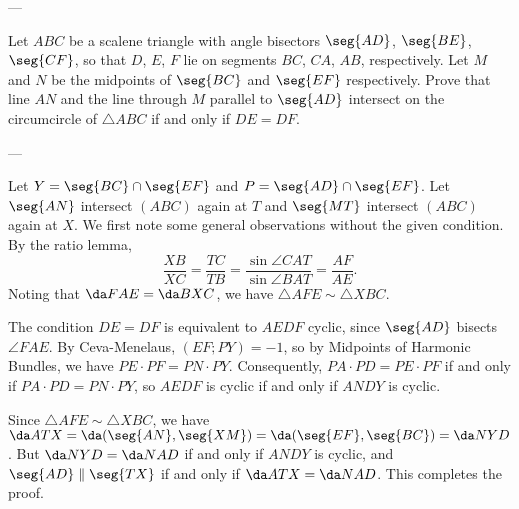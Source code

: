 
---

Let $ABC$ be a scalene triangle with angle bisectors $\seg{AD}$, $\seg{BE}$, $\seg{CF}$, so that $D$, $E$, $F$ lie on segments $BC$, $CA$, $AB$, respectively. Let $M$ and $N$ be the midpoints of $\seg{BC}$ and $\seg{EF}$ respectively. Prove that line $AN$ and the line through $M$ parallel to $\seg{AD}$ intersect on the circumcircle of $\triangle ABC$ if and only if $DE=DF$.

---

Let $Y=\seg{BC}\cap\seg{EF}$ and $P=\seg{AD}\cap\seg{EF}$. Let $\seg{AN}$ intersect $(ABC)$ again at $T$ and $\seg{MT}$ intersect $(ABC)$ again at $X$. We first note some general observations without the given condition. By the ratio lemma, \[\frac{XB}{XC}=\frac{TC}{TB}=\frac{\sin\angle CAT}{\sin\angle BAT}=\frac{AF}{AE}.\]
Noting that $\da FAE=\da BXC$, we have $\triangle AFE\sim\triangle XBC$.

The condition $DE=DF$ is equivalent to $AEDF$ cyclic, since $\seg{AD}$ bisects $\angle FAE$. By Ceva-Menelaus, $(EF;PY)=-1$, so by Midpoints of Harmonic Bundles, we have $PE\cdot PF=PN\cdot PY$. Consequently, $PA\cdot PD=PE\cdot PF$ if and only if $PA\cdot PD=PN\cdot PY$, so $AEDF$ is cyclic if and only if $ANDY$ is cyclic.

Since $\triangle AFE\sim\triangle XBC$, we have $\da ATX=\da(\seg{AN},\seg{XM})=\da(\seg{EF},\seg{BC})=\da NYD$. But $\da NYD=\da NAD$ if and only if $ANDY$ is cyclic, and $\seg{AD}\parallel\seg{TX}$ if and only if $\da ATX=\da NAD$. This completes the proof.

